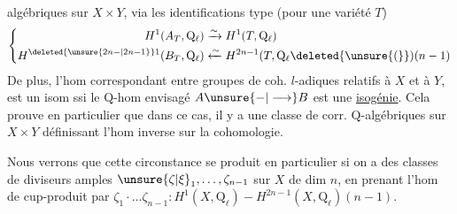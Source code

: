 algébriques sur $X\times Y$, via les identifications  type (pour une variété $T$)
\[
\left\{\begin{aligned}
H^1(A_T,\mathrm{Q}_{\ell})&\xrightarrow{\sim}H^1(T,\mathrm{Q}_{\ell})\\
H^{\deleted{\unsure{2n-|2n-1}}1}(B_T,\mathrm{Q}_{\ell})&\xleftarrow{\sim}H^{2n-1}(T,\mathrm{Q}_{\ell}\deleted{\unsure{(}})(n-1)
\end{aligned}\right.
\]
De plus, l'hom correspondant entre groupes de coh. $l$-adiques relatifs à $X$ et à $Y$, est un isom ssi le $\mathrm{Q}$-hom  envisagé $A\unsure{-|\longrightarrow}B$ est une \uline{isogénie}. Cela prouve en particulier que dans ce cas, il y a une classe de corr. $\mathrm{Q}$-algébriques sur $X\times Y$ définissant l'hom inverse sur la cohomologie.

Nous verrons que cette circonstance se produit en particulier si on a des classes de diviseurs amples $\unsure{\zeta|\xi}_1,\ldots,\zeta_{n-1}$ sur $X$ de dim $n$, en prenant l'hom de cup-produit par \deleted{$\unsure{\xi|\zeta}$} $\zeta_1\cdot\ldots\zeta_{n-1}:H^1(X,\mathrm{Q}_{\ell})-H^{2n-1}(X,\mathrm{Q}_{\ell})(n-1)$.
